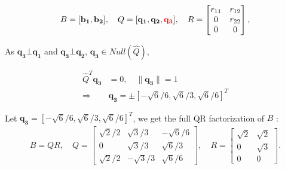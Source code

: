 \begin{align*}
    B = [\mathbf{b_1}, \mathbf{b_2}],
    \quad 
    Q = [\mathbf{q_1}, \mathbf{q_2},\textcolor{red}{\mathbf{q_3}}], \quad
    R = \begin{bmatrix}
                r_{11} & r_{12} 
                \\ 0 & r_{22} 
                \\ 0 & 0 
            \end{bmatrix},\\
\end{align*}

As $\mathbf{q_3} \bot \mathbf{q_1}$ and 
$\mathbf{q_3} \bot \mathbf{q_2} $, 
$\mathbf{q_3} \in Null(\hat{Q})$,

\begin{align*}
    \hat{Q}^T\mathbf{q_3} &= 0, \quad \|\mathbf{q_3}\| = 1 \nonumber \\
    \Rightarrow&
    \mathbf{q_3} = \pm [-\sqrt{6}/6, \sqrt{6}/3, \sqrt{6}/6]^T
\end{align*}

Let $\mathbf{q_3} = [-\sqrt{6}/6, \sqrt{6}/3, \sqrt{6}/6]^T$, we get
the full QR factorization of $B$
:
\begin{align*}
    B = QR, \quad
    Q = \begin{bmatrix}
        \sqrt{2}/2 & \sqrt{3}/3 & -\sqrt{6}/6\\ 0 & \sqrt{3}/3 & \sqrt{6}/3\\ \sqrt{2}/2 & -\sqrt{3}/3 & \sqrt{6}/6
    \end{bmatrix},\quad
    R = \begin{bmatrix}
        \sqrt{2} & \sqrt{2}  \\ 0  & \sqrt{3}  \\ 0 & 0
        \end{bmatrix}.
    \end{align*}
